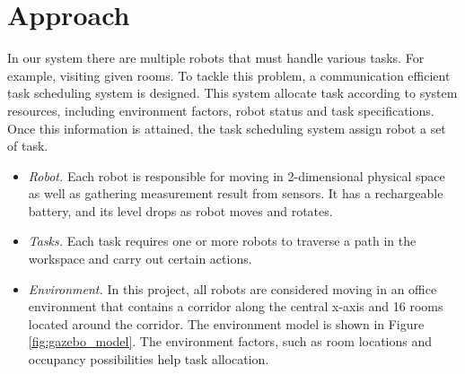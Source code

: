 \chapter{Approach}


In our system there are multiple robots that must handle various tasks. For example, visiting given rooms. To tackle this problem, a communication efficient task scheduling system is designed. 
This system allocate task according to system resources, including environment factors, robot status and task specifications. Once this information is attained, the task scheduling system assign robot a set of task.

\begin{itemize}
	\item \textsl{Robot.} Each robot is responsible for moving in 2-dimensional physical space as well as gathering measurement result from sensors. It has a rechargeable battery, and its level drops as robot moves and rotates.
	\item \textsl{Tasks.} Each task requires one or more robots to traverse a path in the workspace and carry out certain actions\cite{Ivan2017}.
	\item \textsl{Environment.} In this project, all robots are considered moving in an office environment that contains a corridor along the central x-axis and 16 rooms located around the corridor. The environment model is shown in Figure \ref{fig:gazebo_model}. The environment factors, such as room locations and occupancy possibilities help task allocation.
\end{itemize}

